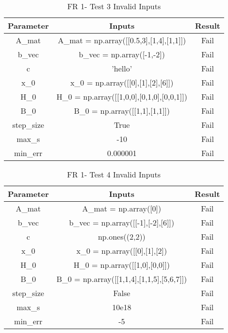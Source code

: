 \documentclass[12pt, titlepage]{article}
\begin{document}
\begin{table}[ht]
\caption{FR 1- Test 3 Invalid Inputs} \label{tbl_FR1T3}
\vspace*{2mm}
\centering
 \begin{tabular}{|c|c|c|} 
 \hline
\textbf{Parameter} & \textbf{Inputs} & \textbf{Result} \\ 
\hline
A\_mat&  A\_mat = np.array([[0.5,3],[1,4],[1,1]])  &Fail \\
 \hline
 b\_vec& b\_vec = np.array([-1,-2]) & Fail \\ 
 \hline
 c& 'hello' & Fail \\ 
 \hline
 x\_0& x\_0 = np.array([[0],[1],[2],[6]]) & Fail\\ 
 \hline
 H\_0& H\_0 = np.array([[1,0,0],[0,1,0],[0,0,1]]) & Fail \\ 
 \hline
 B\_0& B\_0 = np.array([[1,1],[1,1]]) & Fail \\ 
 \hline
 step\_size& True & Fail \\ 
 \hline
 max\_s& -10 & Fail \\ 
 \hline
 min\_err& 0.000001 & Fail \\ 
 \hline
 
\end{tabular}
\end{table}

\begin{table}[ht]
\caption{FR 1- Test 4 Invalid Inputs} \label{tbl_FR1T4}
\vspace*{2mm}
\centering
 \begin{tabular}{|c|c|c|} 
 \hline
\textbf{Parameter} & \textbf{Inputs} & \textbf{Result} \\ 
\hline
A\_mat&  A\_mat = np.array([0])  &Fail \\
 \hline
 b\_vec& b\_vec = np.array([[-1],[-2],[6]]) & Fail \\ 
 \hline
 c& np.ones((2,2)) & Fail \\ 
 \hline
 x\_0& x\_0 = np.array([[0],[1],[2]) & Fail\\ 
 \hline
 H\_0& H\_0 = np.array([[1,0],[0,0]]) & Fail \\ 
 \hline
 B\_0& B\_0 = np.array([[1,1,4],[1,1,5],[5,6,7]]) & Fail \\ 
 \hline
 step\_size& False & Fail \\ 
 \hline
 max\_s& 10e18 & Fail \\ 
 \hline
 min\_err& -5 & Fail \\ 
 \hline
 
\end{tabular}
\end{table}
\end{document}
